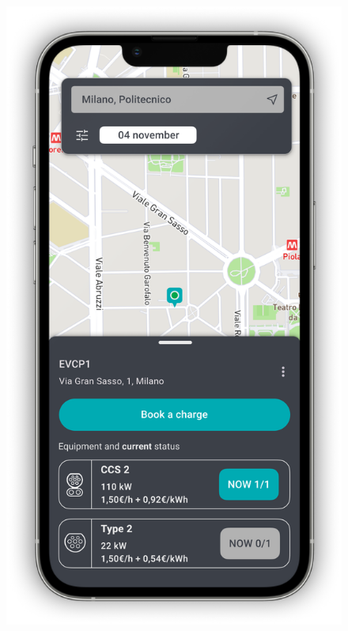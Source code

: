 \begin{figure}[H]
{        \includegraphics[scale=0.32]{src/mockups/selectedStation.png}
    }
    \newline
\end{figure}
